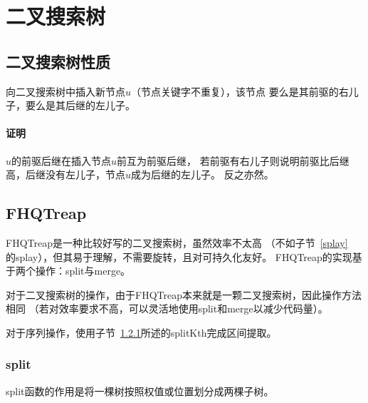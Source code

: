 \section{二叉搜索树}
\subsection{二叉搜索树性质}
\begin{property}
    向二叉搜索树中插入新节点$u$（节点关键字不重复），该节点
    要么是其前驱的右儿子，要么是其后继的左儿子。
\end{property}
\paragraph{证明} $u$的前驱后继在插入节点$u$前互为前驱后继，
若前驱有右儿子则说明前驱比后继高，后继没有左儿子，节点$u$成为后继的左儿子。
反之亦然。
\subsection{FHQTreap}\label{FHQTreap}
FHQTreap是一种比较好写的二叉搜索树，虽然效率不太高
（不如子节~\ref{splay}\\的splay），但其易于理解，不需要旋转，且对可持久化友好。
FHQTreap的实现基于两个操作：split与merge。

对于二叉搜索树的操作，由于FHQTreap本来就是一颗二叉搜索树，因此操作方法相同
（若对效率要求不高，可以灵活地使用split和merge以减少代码量）。

对于序列操作，使用子节~\ref{split}所述的splitKth完成区间提取。

\subsubsection{split}\label{split}

split函数的作用是将一棵树按照权值或位置划分成两棵子树。

